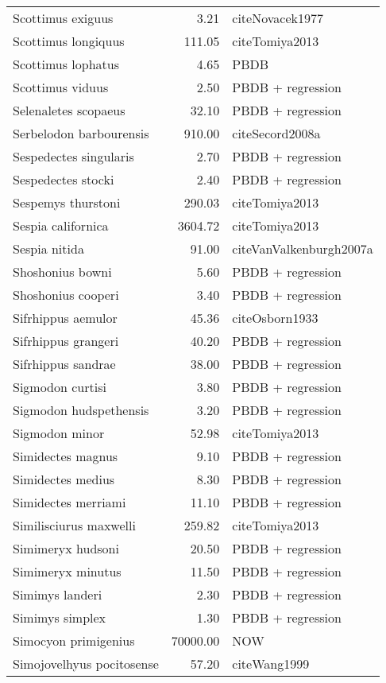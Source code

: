 \begin{table}[ht]
\begin{tabular}{lrl}
  Scottimus exiguus & 3.21 & cite{Novacek1977} \\ 
  Scottimus longiquus & 111.05 & cite{Tomiya2013} \\ 
  Scottimus lophatus & 4.65 & PBDB \\ 
  Scottimus viduus & 2.50 & PBDB + regression \\ 
  Selenaletes scopaeus & 32.10 & PBDB + regression \\ 
  Serbelodon barbourensis & 910.00 & cite{Secord2008a} \\ 
  Sespedectes singularis & 2.70 & PBDB + regression \\ 
  Sespedectes stocki & 2.40 & PBDB + regression \\ 
  Sespemys thurstoni & 290.03 & cite{Tomiya2013} \\ 
  Sespia californica & 3604.72 & cite{Tomiya2013} \\ 
  Sespia nitida & 91.00 & cite{VanValkenburgh2007a} \\ 
  Shoshonius bowni & 5.60 & PBDB + regression \\ 
  Shoshonius cooperi & 3.40 & PBDB + regression \\ 
  Sifrhippus aemulor & 45.36 & cite{Osborn1933} \\ 
  Sifrhippus grangeri & 40.20 & PBDB + regression \\ 
  Sifrhippus sandrae & 38.00 & PBDB + regression \\ 
  Sigmodon curtisi & 3.80 & PBDB + regression \\ 
  Sigmodon hudspethensis & 3.20 & PBDB + regression \\ 
  Sigmodon minor & 52.98 & cite{Tomiya2013} \\ 
  Simidectes magnus & 9.10 & PBDB + regression \\ 
  Simidectes medius & 8.30 & PBDB + regression \\ 
  Simidectes merriami & 11.10 & PBDB + regression \\ 
  Similisciurus maxwelli & 259.82 & cite{Tomiya2013} \\ 
  Simimeryx hudsoni & 20.50 & PBDB + regression \\ 
  Simimeryx minutus & 11.50 & PBDB + regression \\ 
  Simimys landeri & 2.30 & PBDB + regression \\ 
  Simimys simplex & 1.30 & PBDB + regression \\ 
  Simocyon primigenius & 70000.00 & NOW \\ 
  Simojovelhyus pocitosense & 57.20 & cite{Wang1999} \\ 

\end{tabular}
\end{table}
